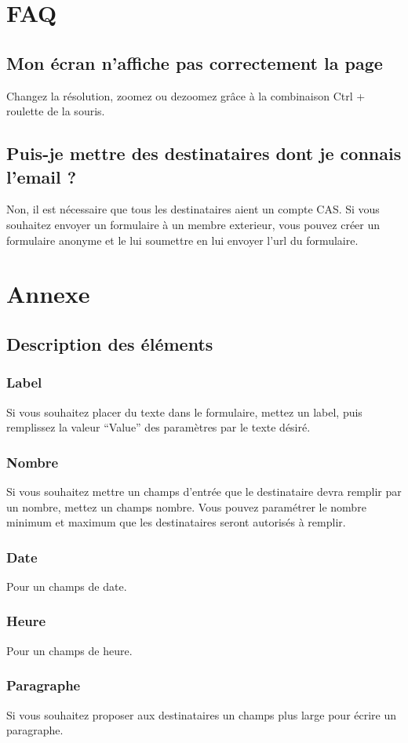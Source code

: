 \documentclass[a4paper,11pt,final]{report}
\begin{document}
\chapter{FAQ}
\section{Mon écran n'affiche pas correctement la page}
Changez la résolution, zoomez ou dezoomez grâce à la combinaison Ctrl + roulette de la souris.
\section{Puis-je mettre des destinataires dont je connais l'email ?}
Non, il est nécessaire que tous les destinataires aient un compte CAS. Si vous souhaitez envoyer un formulaire à un membre exterieur, vous pouvez créer un formulaire anonyme et le lui soumettre en lui envoyer l'url du formulaire.

\chapter{Annexe}
\section{Description des éléments}
\subsection{Label}
Si vous souhaitez placer du texte dans le formulaire, mettez un label, puis remplissez la valeur ``Value'' des paramètres par le texte désiré.
\subsection{Nombre}
Si vous souhaitez mettre un champs d'entrée que le destinataire devra remplir par un nombre, mettez un champs nombre. Vous pouvez paramétrer le nombre minimum et maximum que les destinataires seront autorisés à remplir.
\subsection{Date}
Pour un champs de date.
\subsection{Heure}
Pour un champs de heure.
\subsection{Paragraphe}
Si vous souhaitez proposer aux destinataires un champs plus large pour écrire un paragraphe.
\end{document}
